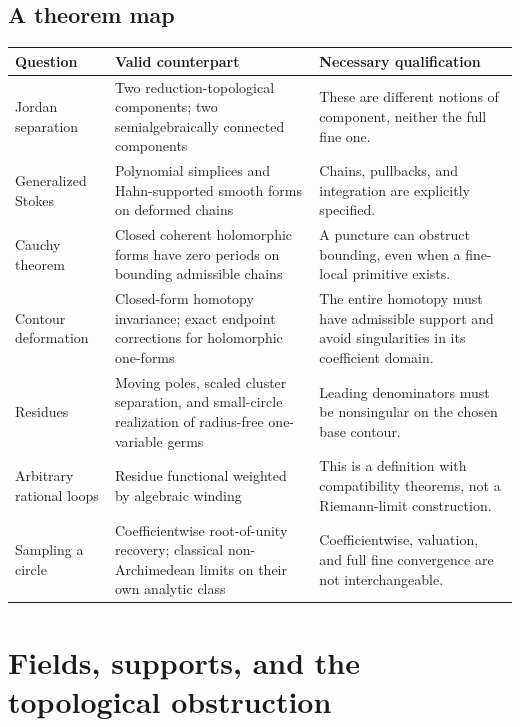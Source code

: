 \documentclass[11pt,letterpaper]{article}
\theoremstyle{definition}
\theoremstyle{remark}
\numberwithin{equation}{section}
\begin{document}
\subsection{A theorem map}
\begin{center}\small
\begin{longtable}{@{}L{0.21\textwidth}L{0.40\textwidth}L{0.29\textwidth}@{}}
\toprule
Question & Valid counterpart & Necessary qualification\\\midrule\endhead
Jordan separation & Two reduction-topological components; two semialgebraically connected components & These are different notions of component, neither the full fine one.\\[0.5em]
Generalized Stokes & Polynomial simplices and Hahn-supported smooth forms on deformed chains & Chains, pullbacks, and integration are explicitly specified.\\[0.5em]
Cauchy theorem & Closed coherent holomorphic forms have zero periods on bounding admissible chains & A puncture can obstruct bounding, even when a fine-local primitive exists.\\[0.5em]
Contour deformation & Closed-form homotopy invariance; exact endpoint corrections for holomorphic one-forms & The entire homotopy must have admissible support and avoid singularities in its coefficient domain.\\[0.5em]
Residues & Moving poles, scaled cluster separation, and small-circle realization of radius-free one-variable germs & Leading denominators must be nonsingular on the chosen base contour.\\[0.5em]
Arbitrary rational loops & Residue functional weighted by algebraic winding & This is a definition with compatibility theorems, not a Riemann-limit construction.\\[0.5em]
Sampling a circle & Coefficientwise root-of-unity recovery; classical non-Archimedean limits on their own analytic class & Coefficientwise, valuation, and full fine convergence are not interchangeable.\\
\bottomrule
\end{longtable}
\end{center}

\section{Fields, supports, and the topological obstruction}\label{sec:foundations}
\end{document}
